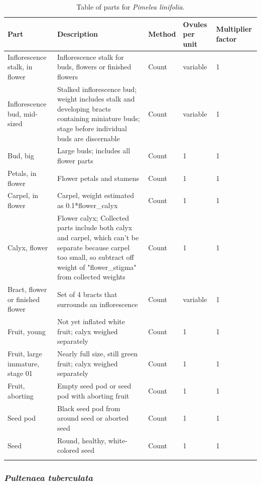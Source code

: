 \documentclass[10pt,twoside]{article}\usepackage[]{graphicx}\usepackage[]{color}
\begin{document}
\begingroup\small
\begin{longtable}{p{4.5cm}p{6cm}p{2cm}p{1cm}p{1cm}}
\caption{Table of parts for \emph{Pimelea linifolia}.} \\ 
  \hline
Part & Description & Method & Ovules per unit & Multiplier factor \\ 
  \hline
Inflorescence stalk, in flower & Inflorescence stalk for buds, flowers or finished flowers & Count & variable &   1 \\ 
  Inflorescence bud, mid-sized & Stalked  inflorescence bud; weight includes stalk and developing bracts containing miniature buds; stage before individual buds are discernable & Count & variable &   1 \\ 
  Bud, big & Large buds; includes all flower parts & Count & 1 &   1 \\ 
  Petals, in flower & Flower petals and stamens & Count & 1 &   1 \\ 
  Carpel, in flower & Carpel, weight estimated as 0.1*flower\_calyx & Count & 1 &   1 \\ 
  Calyx, flower & Flower calyx; Collected parts include both calyx and carpel, which can't be separate because carpel too small, so subtract off weight of "flower\_stigma" from collected weights & Count & 1 &   1 \\ 
  Bract, flower or finished flower & Set of 4 bracts that surrounds an inflorescence & Count & variable &   1 \\ 
  Fruit, young & Not yet inflated white fruit; calyx weighed separately & Count & 1 &   1 \\ 
  Fruit, large immature, stage 01 & Nearly full size, still green fruit; calyx weighed separately & Count & 1 &   1 \\ 
  Fruit, aborting & Empty seed pod or seed pod with aborting fruit & Count & 1 &   1 \\ 
  Seed pod & Black seed pod from around seed or aborted seed & Count & 1 &   1 \\ 
  Seed & Round, healthy, white-colored seed & Count & 1 &   1 \\ 
   \hline
\hline
\label{tab:parts_Pimelea_linifolia}
\end{longtable}
\endgroup


\clearpage

\subsubsection{\emph{Pultenaea tuberculata}}
\end{document}
